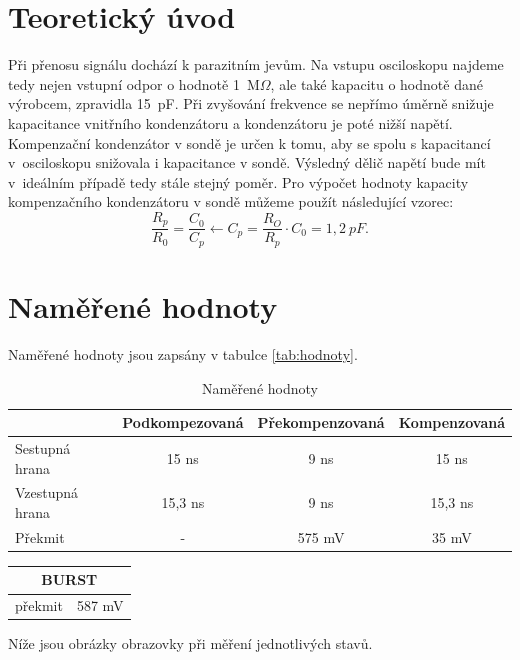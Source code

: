 \documentclass[a4paper,12pt]{article}   %
\newcommand{\tohm}{$\Omega$}
\begin{document}
\section{Teoretický úvod}
\label{chap:teoreticky_uvod}
Při přenosu signálu dochází k parazitním jevům. Na vstupu osciloskopu najdeme tedy nejen vstupní odpor o hodnotě 1~M\tohm , ale také kapacitu o hodnotě dané výrobcem, zpravidla 15~pF. Při zvyšování frekvence se nepřímo úměrně snižuje kapacitance vnitřního kondenzátoru a kondenzátoru je poté nižší napětí. Kompenzační kondenzátor v sondě je určen k tomu, aby se spolu s kapacitancí v~osciloskopu snižovala i kapacitance v sondě. Výsledný dělič napětí bude mít v~ideálním případě tedy stále stejný poměr. Pro výpočet hodnoty kapacity kompenzačního kondenzátoru v sondě můžeme použít následující vzorec:
\begin{equation}
  \frac{R_p}{R_0} = \frac{C_0}{C_p} \leftarrow C_p=\frac{R_O}{R_p}\cdot C_0 = 1,2~pF.
  \label{eq:komp_final}
\end{equation}


\section{Naměřené hodnoty}
\label{chap:namerene_hodnoty}
Naměřené hodnoty jsou zapsány v tabulce \ref{tab:hodnoty}.

\begin{table}[h!]
  \centering
  \begin{tabular}{|l|c||c||c|}
    \hline
    &Podkompezovaná&Překompenzovaná &Kompenzovaná\\\hline
    Sestupná hrana &15 ns&9 ns&15 ns\\\hline
    Vzestupná hrana&15,3 ns&9 ns&15,3 ns\\\hline
    Překmit&-&575 mV&35 mV\\\hline
  \end{tabular}
  \caption{Naměřené hodnoty}
  \label{tab:hotnoty}
\end{table}

\begin{table}[h!]
  \centering
  \begin{tabular}{|c|c|}
    \hline
    \multicolumn{2}{c}{BURST}\\\hline
    překmit&587 mV\\\hline
  \end{tabular}
\end{table}

Níže jsou obrázky obrazovky při měření jednotlivých stavů.
\end{document}
